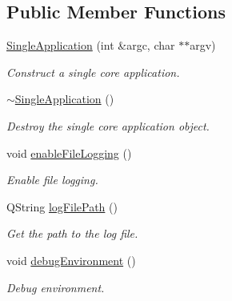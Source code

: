 \subsection*{Public Member Functions}
\begin{DoxyCompactItemize}
\item 
\hyperlink{class_mdt_1_1_single_application_a481cd7bad65a75dd891ca33cb80c82c5}{Single\+Application} (int \&argc, char $\ast$$\ast$argv)\hypertarget{class_mdt_1_1_single_application_a481cd7bad65a75dd891ca33cb80c82c5}{}\label{class_mdt_1_1_single_application_a481cd7bad65a75dd891ca33cb80c82c5}

\begin{DoxyCompactList}\small\item\em Construct a single core application. \end{DoxyCompactList}\item 
\hyperlink{class_mdt_1_1_single_application_a49ff3421ee835333c6ebc00e8cdbf7ba}{$\sim$\+Single\+Application} ()\hypertarget{class_mdt_1_1_single_application_a49ff3421ee835333c6ebc00e8cdbf7ba}{}\label{class_mdt_1_1_single_application_a49ff3421ee835333c6ebc00e8cdbf7ba}

\begin{DoxyCompactList}\small\item\em Destroy the single core application object. \end{DoxyCompactList}\item 
void \hyperlink{class_mdt_1_1_single_application_abfd6a19af0b13b2785f2db7dd8db82a0}{enable\+File\+Logging} ()
\begin{DoxyCompactList}\small\item\em Enable file logging. \end{DoxyCompactList}\item 
Q\+String \hyperlink{class_mdt_1_1_single_application_a77ad0fd06b6b46107dc2f6c170325987}{log\+File\+Path} ()\hypertarget{class_mdt_1_1_single_application_a77ad0fd06b6b46107dc2f6c170325987}{}\label{class_mdt_1_1_single_application_a77ad0fd06b6b46107dc2f6c170325987}

\begin{DoxyCompactList}\small\item\em Get the path to the log file. \end{DoxyCompactList}\item 
void \hyperlink{class_mdt_1_1_single_application_a884f933e6b26b1a36b564e2b5e8f8536}{debug\+Environment} ()
\begin{DoxyCompactList}\small\item\em Debug environment. \end{DoxyCompactList}\end{DoxyCompactItemize}
